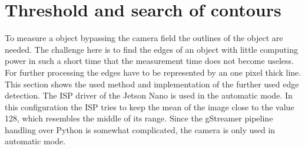 \newpage
\section{Threshold and search of contours}
To measure a object bypassing the camera field the outlines of the object are needed. The challenge here is to find the edges of an object with little computing power in such a short time that the measurement time does not become useless. For further processing the edges have to be represented by an one pixel thick line. This section shows the used method and implementation of the further used edge detection. The ISP driver of the Jetson Nano is used in the automatic mode. In this configuration the ISP tries to keep the mean of the image close to the value 128, which resembles the middle of its range. Since the gStreamer pipeline handling over Python is somewhat complicated, the camera is only used in automatic mode.

